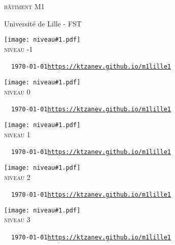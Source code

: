 \documentclass{article}
\newcommand{\niveau}[1]{
\clearpage
\begin{center}
  \texttt{[image: niveau\#1.pdf]}\\
  {\Huge \textsc{niveau #1}}
\end{center}
\vfill\tiny~~\texttt{\today}\hfill\texttt{\url{https://ktzanev.github.io/m1lille1}}
}
\begin{document}
\begin{center}
\vspace*{\fill}
{\Huge \textsc{bâtiment M1}}

\vspace{1cm}
{\Large Université de Lille - FST}
\vspace*{\fill}
\end{center}

\niveau{-1}
\niveau{0}
\niveau{1}
\niveau{2}
\niveau{3}~
\end{document}
